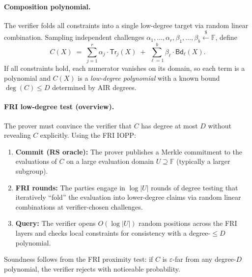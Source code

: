 \paragraph{Composition polynomial.}
The verifier folds all constraints into a single low-degree target via random
linear combination. Sampling independent challenges
$\alpha_1,\dots,\alpha_r,\beta_1,\dots,\beta_b \xleftarrow{\$}\mathbb{F}$,
define
\[
  C(X)
  \;=\;
  \sum_{j=1}^{r} \alpha_j \cdot \mathsf{Tr}_j(X)
  \;+\;
  \sum_{\ell=1}^{b} \beta_\ell \cdot \mathsf{Bd}_\ell(X).
\]
If all constraints hold, each numerator vanishes on its domain, so each term is a polynomial and
$C(X)$ is a \emph{low-degree polynomial} with a known bound $\deg(C)\le D$ determined by AIR degrees.

\paragraph{FRI low-degree test (overview).}
The prover must convince the verifier that $C$ has degree at most $D$ without
revealing $C$ explicitly. Using the FRI IOPP:
\begin{enumerate}
  \item \textbf{Commit (RS oracle):} The prover publishes a Merkle commitment to the evaluations of $C$ on a large evaluation domain $U\supseteq \mathbb{F}$ (typically a larger subgroup).
  \item \textbf{FRI rounds:} The parties engage in $\log |U|$ rounds of degree testing that iteratively “fold” the evaluation into lower-degree claims via random linear combinations at verifier-chosen challenges.
  \item \textbf{Query:} The verifier opens $O(\log |U|)$ random positions across the FRI layers and checks local constraints for consistency with a degree-$\le D$ polynomial.
\end{enumerate}
Soundness follows from the FRI proximity test: if $C$ is $\varepsilon$-far from any degree-$D$
polynomial, the verifier rejects with noticeable probability.

